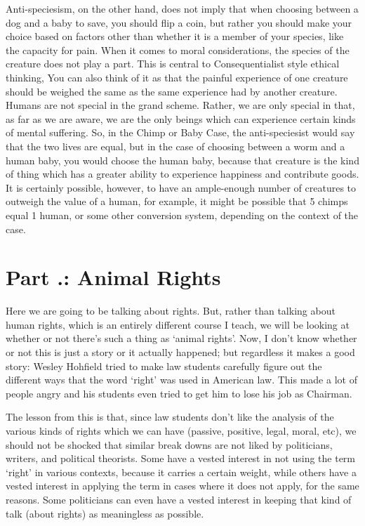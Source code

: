 Anti-speciesism, on the other hand, does not imply that when choosing between a dog and a baby to save, you should flip a coin, but rather you should make your choice based on factors other than whether it is a member of your species, like the capacity for pain. When it comes to moral considerations, the species of the creature does not play a part. This is central to Consequentialist style ethical thinking, You can also think of it as that the painful experience of one creature should be weighed the same as the same experience had by another creature. Humans are not special in the grand scheme. Rather, we are only special in that, as far as we are aware, we are the only beings which can experience certain kinds of mental suffering. So, in the Chimp or Baby Case, the anti-speciesist would say that the two lives are equal, but in the case of choosing between a worm and a human baby, you would choose the human baby, because that creature is the kind of thing which has a greater ability to experience happiness and contribute goods.  It is certainly possible, however, to have an ample-enough number of creatures to outweigh the value of a human, for example, it might be possible that 5 chimps equal 1 human, or some other conversion system, depending on the context of the case. 

\section{Part \thechapcount.\theseccount: Animal Rights}
Here we are going to be talking about rights. But, rather than talking about human rights, which is an entirely different course I teach, we will be looking at whether or not there's such a thing as `animal rights'. Now, I don't know whether or not this is just a story or it actually happened; but regardless it makes a good story: Wesley Hohfield tried to make law students carefully figure out the different ways that the word ‘right’ was used in American law. This made a lot of people angry and his students even tried to get him to lose his job as Chairman. 

The lesson from this is that, since law students don’t like the analysis of the various kinds of rights which we can have (passive, positive, legal, moral, etc), we should not be shocked that similar break downs are not liked by politicians, writers, and political theorists. Some have a vested interest in not using the term `right' in various contexts, because it carries a certain weight, while others have a vested interest in applying the term in cases where it does not apply, for the same reasons. Some politicians can even have a vested interest in keeping that kind of talk (about rights) as meaningless as possible.

